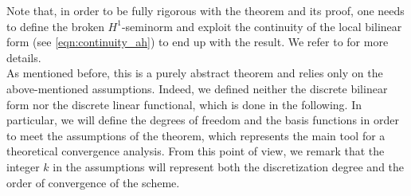 \documentclass[10pt]{article}
\begin{document}
Note that, in order to be fully rigorous with the theorem and its proof, one needs to define the broken $H^1$-seminorm and exploit the continuity of the local bilinear form (see \eqref{eqn:continuity_ah}) to end up with the result. We refer to \cite{Basic_principles} for more details. \\
As mentioned before, this is a purely abstract theorem and relies only on the above-mentioned assumptions. Indeed, we defined neither the discrete bilinear form nor the discrete linear functional, which is done in the following. In particular, we will define the degrees of freedom and the basis functions in order to meet the assumptions of the theorem, which represents the main tool for a theoretical convergence analysis. From this point of view, we remark that the integer $k$ in the assumptions will represent both the discretization degree and the order of convergence of the scheme. \\
\end{document}
